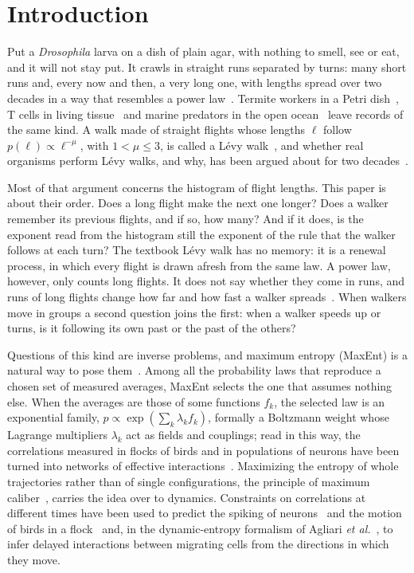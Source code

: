 \section{Introduction}\label{sec:intro}

Put a \emph{Drosophila} larva on a dish of plain agar, with nothing to smell, see or eat, and it will not stay put. It crawls in straight runs separated by turns: many short runs and, every now and then, a very long one, with lengths spread over two decades in a way that resembles a power law~\cite{Sims2019}. Termite workers in a Petri dish~\cite{Castiblanco2019}, T cells in living tissue~\cite{Jerison2020} and marine predators in the open ocean~\cite{Humphries2010} leave records of the same kind. A walk made of straight flights whose lengths $\ell$ follow $p(\ell)\propto\ell^{-\mu}$, with $1<\mu\le3$, is called a L\'evy walk~\cite{Viswanathan1999,Zaburdaev2015}, and whether real organisms perform L\'evy walks, and why, has been argued about for two decades~\cite{Edwards2007,Pyke2015,Reynolds2018}.

Most of that argument concerns the histogram of flight lengths. This paper is about their order. Does a long flight make the next one longer? Does a walker remember its previous flights, and if so, how many? And if it does, is the exponent read from the histogram still the exponent of the rule that the walker follows at each turn? The textbook L\'evy walk has no memory: it is a renewal process, in which every flight is drawn afresh from the same law. A power law, however, only counts long flights. It does not say whether they come in runs, and runs of long flights change how far and how fast a walker spreads~\cite{Aghion2021}. When walkers move in groups a second question joins the first: when a walker speeds up or turns, is it following its own past or the past of the others?

Questions of this kind are inverse problems, and maximum entropy (MaxEnt) is a natural way to pose them~\cite{Jaynes1957}. Among all the probability laws that reproduce a chosen set of measured averages, MaxEnt selects the one that assumes nothing else. When the averages are those of some functions $f_k$, the selected law is an exponential family, $p\propto\exp(\sum_k\lambda_kf_k)$, formally a Boltzmann weight whose Lagrange multipliers $\lambda_k$ act as fields and couplings; read in this way, the correlations measured in flocks of birds and in populations of neurons have been turned into networks of effective interactions~\cite{Bialek2012,Mora2016,Roudi2011,Nguyen2017}. Maximizing the entropy of whole trajectories rather than of single configurations, the principle of maximum caliber~\cite{Presse2013,Ge2012}, carries the idea over to dynamics. Constraints on correlations at different times have been used to predict the spiking of neurons~\cite{Marre2009} and the motion of birds in a flock~\cite{Cavagna2014} and, in the dynamic-entropy formalism of Agliari \emph{et al.}~\cite{Agliari2024}, to infer delayed interactions between migrating cells from the directions in which they move.

